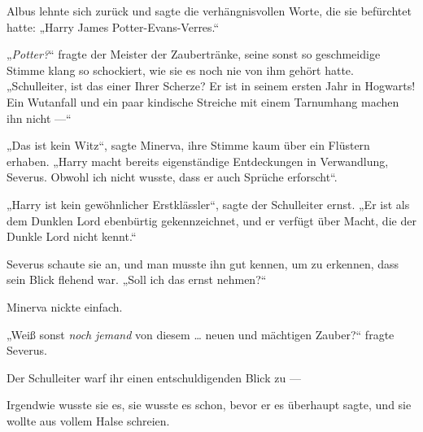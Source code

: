 Albus lehnte sich zurück und sagte die verhängnisvollen Worte, die sie befürchtet hatte:
„Harry James Potter-Evans-Verres.“

„\emph{Potter?}“ fragte der Meister der Zaubertränke, seine sonst so geschmeidige Stimme klang so schockiert, wie sie es noch nie von ihm gehört hatte.
„Schulleiter, ist das einer Ihrer Scherze? Er ist in seinem ersten Jahr in Hogwarts! Ein Wutanfall und ein paar kindische Streiche mit einem Tarnumhang machen ihn nicht —“

„Das ist kein Witz“, sagte Minerva, ihre Stimme kaum über ein Flüstern erhaben.
„Harry macht bereits eigenständige Entdeckungen in Verwandlung, Severus. Obwohl ich nicht wusste, dass er auch Sprüche erforscht“.

„Harry ist kein gewöhnlicher Erstklässler“, sagte der Schulleiter ernst.
„Er ist als dem Dunklen Lord ebenbürtig gekennzeichnet, und er verfügt über Macht, die der Dunkle Lord nicht kennt.“

Severus schaute sie an, und man musste ihn gut kennen, um zu erkennen, dass sein Blick flehend war.
„Soll ich das ernst nehmen?“

Minerva nickte einfach.

„Weiß sonst \emph{noch} \emph{jemand} von diesem … neuen und mächtigen Zauber?“ fragte Severus.

Der Schulleiter warf ihr einen entschuldigenden Blick zu —

Irgendwie wusste sie es, sie wusste es schon, bevor er es überhaupt sagte, und sie wollte aus vollem Halse schreien.

